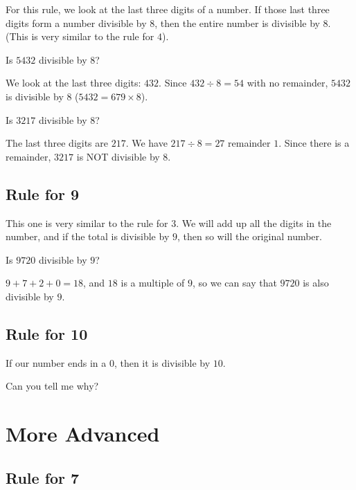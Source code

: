 \documentclass{article}
\theoremstyle{mytheoremstyle}
\theoremstyle{mytheoremstyle}
\theoremstyle{myproblemstyle}
\theoremstyle{myproblemstyle}
\begin{document}
        For this rule, we look at the last three digits of a number. If those last three digits form a number divisible by $8$, then the entire number is divisible by $8$. (This is very similar to the rule for $4$).

        \begin{example}
            Is $5432$ divisible by $8$?
        \end{example}

        We look at the last three digits: $432$. Since $432 \div 8 = 54$ with no remainder, $5432$ is divisible by $8$ ($5432 = 679 \times 8$).

        \begin{example}
            Is $3217$ divisible by $8$?
        \end{example}

        The last three digits are $217$. We have $217 \div 8 = 27$ remainder $1$. Since there is a remainder, $3217$ is NOT divisible by $8$.

        \subsection{Rule for 9}
        This one is very similar to the rule for $3$. We will add up all the digits in the number, and if the total is divisible by $9$, then so will the original number.

        \begin{example}
            Is $9720$ divisible by $9$?
        \end{example}

        $9 + 7 + 2 + 0 = 18$, and $18$ is a multiple of $9$, so we can say that $9720$ is also divisible by $9$.

        \subsection{Rule for 10}
        If our number ends in a $0$, then it is divisible by $10$. 

        \begin{problem}
            Can you tell me why?
        \end{problem}

        \section{More Advanced}

        \subsection{Rule for 7}
\end{document}
